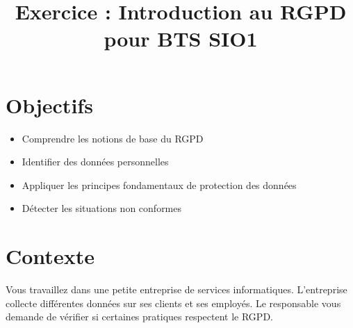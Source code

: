 \documentclass[a4paper, 11pt]{article}
\title{Exercice : Introduction au RGPD pour BTS SIO1}
\author{}
\date{}
\begin{document}
\maketitle
\thispagestyle{empty}

\section*{Objectifs}
\begin{itemize}
    \item Comprendre les notions de base du RGPD
    \item Identifier des données personnelles
    \item Appliquer les principes fondamentaux de protection des données
    \item Détecter les situations non conformes
\end{itemize}

\section*{Contexte}
Vous travaillez dans une petite entreprise de services informatiques. L'entreprise collecte différentes données sur ses clients et ses employés. Le responsable vous demande de vérifier si certaines pratiques respectent le RGPD.
\end{document}
